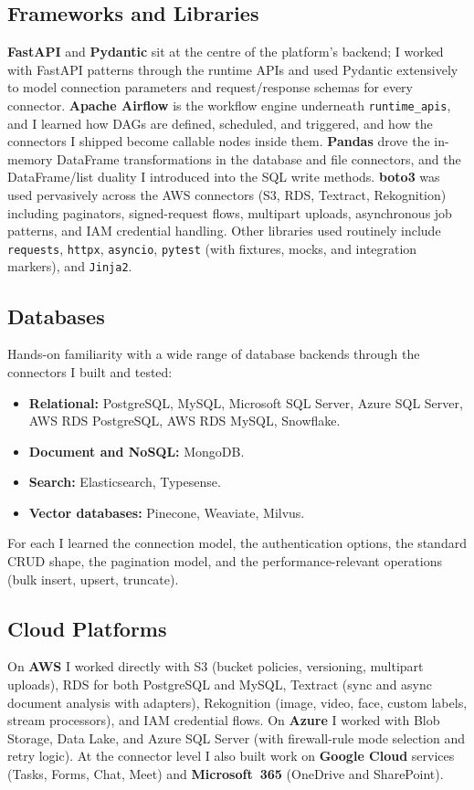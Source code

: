 \subsection{Frameworks and Libraries}
\textbf{FastAPI} and \textbf{Pydantic} sit at the centre of the
platform's backend; I worked with FastAPI patterns through the
runtime APIs and used Pydantic extensively to model connection
parameters and request/response schemas for every connector.
\textbf{Apache Airflow} is the workflow engine underneath
\texttt{runtime\_apis}, and I learned how DAGs are defined,
scheduled, and triggered, and how the connectors I shipped become
callable nodes inside them. \textbf{Pandas} drove the in-memory
DataFrame transformations in the database and file connectors, and
the DataFrame/list duality I introduced into the SQL write methods.
\textbf{boto3} was used pervasively across the AWS connectors (S3,
RDS, Textract, Rekognition) including paginators, signed-request
flows, multipart uploads, asynchronous job patterns, and IAM
credential handling. Other libraries used routinely include
\texttt{requests}, \texttt{httpx}, \texttt{asyncio},
\texttt{pytest} (with fixtures, mocks, and integration markers),
and \texttt{Jinja2}.

\subsection{Databases}
Hands-on familiarity with a wide range of database backends through
the connectors I built and tested:

\begin{itemize}[leftmargin=*]
    \item \textbf{Relational:} PostgreSQL, MySQL, Microsoft SQL
    Server, Azure SQL Server, AWS RDS PostgreSQL, AWS RDS MySQL,
    Snowflake.
    \item \textbf{Document and NoSQL:} MongoDB.
    \item \textbf{Search:} Elasticsearch, Typesense.
    \item \textbf{Vector databases:} Pinecone, Weaviate, Milvus.
\end{itemize}

For each I learned the connection model, the authentication options,
the standard CRUD shape, the pagination model, and the
performance-relevant operations (bulk insert, upsert, truncate).

\subsection{Cloud Platforms}
On \textbf{AWS} I worked directly with S3 (bucket policies,
versioning, multipart uploads), RDS for both PostgreSQL and MySQL,
Textract (sync and async document analysis with adapters),
Rekognition (image, video, face, custom labels, stream processors),
and IAM credential flows. On \textbf{Azure} I worked with Blob
Storage, Data Lake, and Azure SQL Server (with firewall-rule mode
selection and retry logic). At the connector level I also built
work on \textbf{Google Cloud} services (Tasks, Forms, Chat, Meet)
and \textbf{Microsoft~365} (OneDrive and SharePoint).

